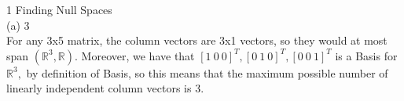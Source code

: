 \documentclass{article}
\begin{document}
{\Large 1 Finding Null Spaces} \\[.5cm]
(a) 3 \\[.3cm]
\indent For any 3x5 matrix, the column vectors are 3x1 vectors, so they would at most span $(\mathbb{R}^3, \mathbb{R}).$ Moreover, we have that $[1\ 0\ 0]^T, [0\ 1\ 0]^T, [0\ 0\ 1]^T$ is a Basis for $\mathbb{R}^3,$ by definition of Basis, so this means that the maximum possible number of linearly independent column vectors is 3. \\[.5cm]
\end{document}
